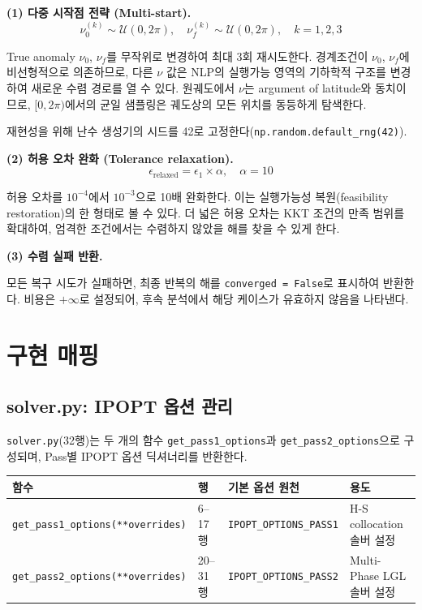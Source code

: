 \documentclass[11pt]{article}
\begin{document}
\textbf{(1) 다중 시작점 전략 (Multi-start).}
%
\begin{equation}\label{eq:multi-start}
\nu_0^{(k)} \sim \mathcal{U}(0, 2\pi), \quad \nu_f^{(k)} \sim \mathcal{U}(0, 2\pi), \quad k = 1, 2, 3
\end{equation}

True anomaly $\nu_0$, $\nu_f$를 무작위로 변경하여 최대 3회 재시도한다. 경계조건이 $\nu_0$, $\nu_f$에 비선형적으로 의존하므로, 다른 $\nu$ 값은 NLP의 실행가능 영역의 기하학적 구조를 변경하여 새로운 수렴 경로를 열 수 있다. 원궤도에서 $\nu$는 argument of latitude와 동치이므로, $[0, 2\pi)$에서의 균일 샘플링은 궤도상의 모든 위치를 동등하게 탐색한다.

재현성을 위해 난수 생성기의 시드를 42로 고정한다(\texttt{np.random.default\_rng(42)}).

\textbf{(2) 허용 오차 완화 (Tolerance relaxation).}
%
\begin{equation}\label{eq:tol-relaxation}
\epsilon_{\text{relaxed}} = \epsilon_1 \times \alpha, \quad \alpha = 10
\end{equation}

허용 오차를 $10^{-4}$에서 $10^{-3}$으로 10배 완화한다. 이는 실행가능성 복원(feasibility restoration)의 한 형태로 볼 수 있다. 더 넓은 허용 오차는 KKT 조건의 만족 범위를 확대하여, 엄격한 조건에서는 수렴하지 않았을 해를 찾을 수 있게 한다.

\textbf{(3) 수렴 실패 반환.}

모든 복구 시도가 실패하면, 최종 반복의 해를 \texttt{converged = False}로 표시하여 반환한다. 비용은 $+\infty$로 설정되어, 후속 분석에서 해당 케이스가 유효하지 않음을 나타낸다.


\section{구현 매핑}

\subsection{solver.py: IPOPT 옵션 관리}

\texttt{solver.py}(32행)는 두 개의 함수 \texttt{get\_pass1\_options}과 \texttt{get\_pass2\_options}으로 구성되며, Pass별 IPOPT 옵션 딕셔너리를 반환한다.

\begin{table}[h]
\centering
\begin{tabular}{@{}llll@{}}
\toprule
함수 & 행 & 기본 옵션 원천 & 용도 \\
\midrule
\texttt{get\_pass1\_options(**overrides)} & 6--17행 & \texttt{IPOPT\_OPTIONS\_PASS1} & H-S collocation 솔버 설정 \\
\texttt{get\_pass2\_options(**overrides)} & 20--31행 & \texttt{IPOPT\_OPTIONS\_PASS2} & Multi-Phase LGL 솔버 설정 \\
\bottomrule
\end{tabular}
\end{table}
\end{document}
